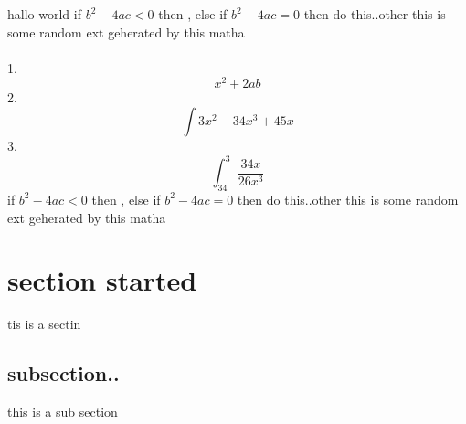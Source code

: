 \documentclass[12pt,a4paper]{article}
\begin{document}
hallo world if $b^2-4ac<0$ then , else if $b^2-4ac=0$ then do this..other this is some random ext geherated by this matha\\ \\
1.$$x^2+2ab$$
2.$$\int{3x^2-34x^3+45x}$$
3.$$\int_{34}^{3} { \dfrac{34x}{26x^3} }$$
\linebreak
if $b^2-4ac<0$ then , else if $b^2-4ac=0$ then do this..other this is some random ext geherated by this matha
\section{section started}
tis is a sectin
\subsection{subsection..}
this is a sub section
\end{document}
